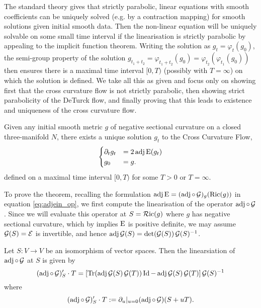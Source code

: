 \documentclass[a4paper, 12pt]{amsart}
\begin{document}
The standard theory gives that strictly parabolic, linear equations with smooth coefficients can be uniquely solved (e.g. by a contraction mapping) for smooth solutions given initial smooth data. Then the non-linear equation will be uniquely solvable on some small time interval if the linearisation is strictly parabolic by appealing to the implicit function theorem. Writing the solution as \(g_t = \varphi_t(g_0)\), the semi-group property of the solution \(g_{t_1 + t_2} = \varphi_{t_1 + t_2} (g_0) = \varphi_{t_2} (\varphi_{t_1} (g_0))\) then ensures there is a maximal time interval \([0, T)\) (possibly with \(T = \infty\)) on which the solution is defined. We take all this as given and focus only on showing first that the cross curvature flow is not strictly parabolic, then showing strict parabolicity of the DeTurck flow, and finally proving that this leads to existence and uniqueness of the cross curvature flow.


\begin{thm}
\label{thm:xcf_existence_uniqueness}

Given any initial smooth metric \(g\) of negative sectional curvature on a closed three-manifold \(N\), there exists a unique solution \(g_t\) to the Cross Curvature Flow,
\[
\begin{cases}
\partial_t g_t &= 2\operatorname{adj}\operatorname{E}(g_t) \\
g_0 &= g.
\end{cases}
\]
defined on a maximal time interval \([0, T)\) for some \(T > 0\) or \(T = \infty\).
\end{thm}

To prove the theorem, recalling the formulation \(\operatorname{adj}\operatorname{E} = (\operatorname{adj}\circ\operatorname{\mathcal{G}})_g (\operatorname{Ric}(g))\) in equation \eqref{eq:adjein_op}, we first compute the linearisation of the operator \(\operatorname{adj} \circ \operatorname{\mathcal{G}}\). Since we will evaluate this operator at \(S = \operatorname{\mathcal{R}ic}(g)\) where \(g\) has negative sectional curvature, which by  implies \(\operatorname{E}\) is positive definite, we may assume \(\operatorname{\mathcal{G}}(S) = \operatorname{\mathcal{E}}\) is invertible, and hence \(\operatorname{adj} \operatorname{\mathcal{G}}(S) = \det(\operatorname{\mathcal{G}}(S)) \operatorname{\mathcal{G}}(S)^{-1}\).

\begin{lemma}
\label{lem:dadjG}

Let \(S : V \to V\) be an isomorphism of vector spaces. Then the linearsiation of \(\operatorname{adj} \circ \operatorname{\mathcal{G}}\) at \(S\) is given by
\[
(\operatorname{adj} \circ \operatorname{\mathcal{G}})'_S \cdot T  = \left[\operatorname{Tr}(\operatorname{adj}\operatorname{\mathcal{G}}(S) \operatorname{\mathcal{G}}(T))\operatorname{Id} - \operatorname{adj}\operatorname{\mathcal{G}}(S) \operatorname{\mathcal{G}}(T)\right] \operatorname{\mathcal{G}}(S)^{-1}
\]
where
\[
(\operatorname{adj} \circ \operatorname{\mathcal{G}})'_S \cdot T := \partial_u|_{u=0} (\operatorname{adj} \circ \operatorname{\mathcal{G}}) (S + uT).
\]
\end{lemma}
\end{document}
